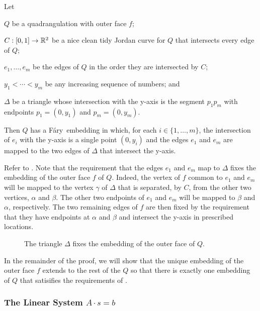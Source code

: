 \documentclass{patmorin}
\newcommand{\Fary}{Fáry}
\begin{document}
\begin{thm}
    Let
    \begin{compactitem}
    \item $Q$ be a quadrangulation with outer face $f$; 
    \item $C:[0,1]\to\mathbb{R}^2$ be a nice clean tidy Jordan curve for $Q$
     that intersects every edge of $Q$;
    \item $e_1,\ldots,e_m$ be the edges of $Q$ in the
    order they are intersected by $C$; 
    \item $y_1<\cdots<y_m$
    be any increasing sequence of numbers; and
    \item $\Delta$ be a triangle whose intersection with the y-axis
     is the segment $p_1p_m$ with endpoints $p_1=(0,y_1)$ and $p_m=(0,y_m)$.
    \end{compactitem}
    Then $Q$ has a \Fary\ embedding in which, for each
    $i\in\{1,\ldots,m\}$, the intersection of $e_i$ with the y-axis is
    a single point $(0,y_i)$ and the edges $e_1$ and $e_m$ are mapped
    to the two edges of $\Delta$ that intersect the y-axis.
\end{thm}

Refer to .
Note that the requirement that the edges $e_1$ and $e_m$ map to $\Delta$
fixes the embedding of the outer face $f$ of $Q$. Indeed, the vertex of
$f$ common to $e_1$ and $e_m$ will be mapped to the vertex $\gamma$ of
$\Delta$ that is separated, by $C$, from the other two vertices, $\alpha$
and $\beta$.  The other two endpoints of $e_1$ and $e_m$ will be mapped
to $\beta$ and $\alpha$, respectively.  The two remaining edges of $f$
are then fixed by the requirement that they have endpoints at $\alpha$
and $\beta$ and intersect the y-axis in prescribed locations.

\begin{figure}
   \caption{The triangle $\Delta$ fixes the embedding of the outer face of $Q$.}
\end{figure}

In the remainder of the proof, we will show that the unique embedding of
the outer face $f$ extends to the rest of the $Q$ so that there is exactly
one embedding of $Q$ that satisifies the requirements of .

\subsubsection{The Linear System $A\cdot s=b$}
\end{document}
